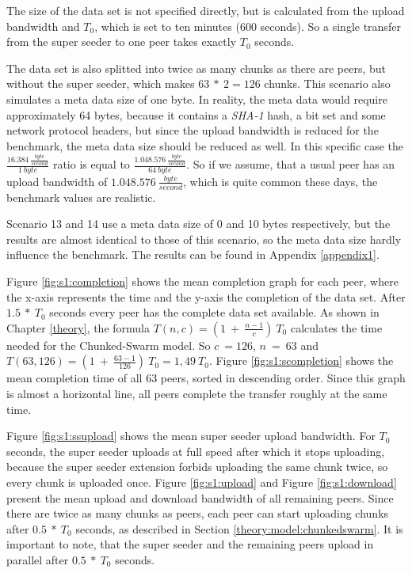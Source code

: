 The size of the data set is not specified directly, but is calculated from the upload bandwidth and $T_0$, which is set to ten minutes (600 seconds). So a single transfer from the super seeder to one peer takes exactly $T_0$ seconds. 

The data set is also splitted into twice as many chunks as there are peers, but without the super seeder, which makes $63\:*\:2=126$ chunks. This scenario also simulates a meta data size of one byte. In reality, the meta data would require approximately 64 bytes, because it contains a \emph{SHA-1} hash, a bit set and some network protocol headers, but since the upload bandwidth is reduced for the benchmark, the meta data size should be reduced as well. In this specific case the $\frac{16.384\:\frac{byte}{second}}{1\:byte}$ ratio is equal to $\frac{1.048.576\:\frac{byte}{second}}{64\:byte}$. So if we assume, that a usual peer has an upload bandwidth of $1.048.576\:\frac{byte}{second}$, which is quite common these days, the benchmark values are realistic.

Scenario 13 and 14 use a meta data size of 0 and 10 bytes respectively, but the results are almost identical to those of this scenario, so the meta data size hardly influence the benchmark. The results can be found in Appendix \ref{appendix1}.

Figure \ref{fig:s1:completion} shows the mean completion graph for each peer, where the x-axis represents the time and the y-axis the completion of the data set. After $1.5\:*\:T_0$ seconds every peer has the complete data set available. As shown in Chapter \ref{theory}, the formula $T(n, c) = (1\:+\:\frac{n-1}{c})\:T_0$ calculates the time needed for the Chunked-Swarm model. So $c\:=126$, $n\:=\:63$ and $T(63, 126) = (1\:+\:\frac{63-1}{126})\:T_0 = 1,49\:T_0$. Figure \ref{fig:s1:scompletion} shows the mean completion time of all 63 peers, sorted in descending order. Since this graph is almost a horizontal line, all peers complete the transfer roughly at the same time.

Figure \ref{fig:s1:ssupload} shows the mean super seeder upload bandwidth. For $T_0$ seconds, the super seeder uploads at full speed after which it stops uploading, because the super seeder extension forbids uploading the same chunk twice, so every chunk is uploaded once. Figure \ref{fig:s1:upload} and Figure \ref{fig:s1:download} present the mean upload and download bandwidth of all remaining peers. Since there are twice as many chunks as peers, each peer can start uploading chunks after $0.5\:*\:T_0$ seconds, as described in Section \ref{theory:model:chunkedswarm}. It is important to note, that the super seeder and the remaining peers upload in parallel after $0.5\:*\:T_0$ seconds.


